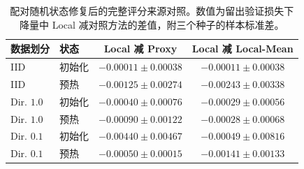 \begin{table}[t]
\centering
\caption{配对随机状态修复后的完整评分来源对照。数值为留出验证损失下降量中 Local 减对照方法的差值，附三个种子的样本标准差。}
\label{tab:fm-source-control}
\small
\begin{tabular}{@{}llcc@{}}
\toprule
数据划分 & 状态 & Local 减 Proxy & Local 减 Local-Mean \\
\midrule
IID & 初始化 & $-0.00011\pm0.00038$ & $-0.00011\pm0.00038$ \\
IID & 预热 & $-0.00125\pm0.00274$ & $-0.00243\pm0.00338$ \\
Dir. $1.0$ & 初始化 & $-0.00040\pm0.00076$ & $-0.00029\pm0.00056$ \\
Dir. $1.0$ & 预热 & $-0.00090\pm0.00122$ & $-0.00028\pm0.00068$ \\
Dir. $0.1$ & 初始化 & $-0.00440\pm0.00467$ & $-0.00049\pm0.00816$ \\
Dir. $0.1$ & 预热 & $-0.00050\pm0.00015$ & $-0.00141\pm0.00133$ \\
\bottomrule
\end{tabular}
\end{table}
